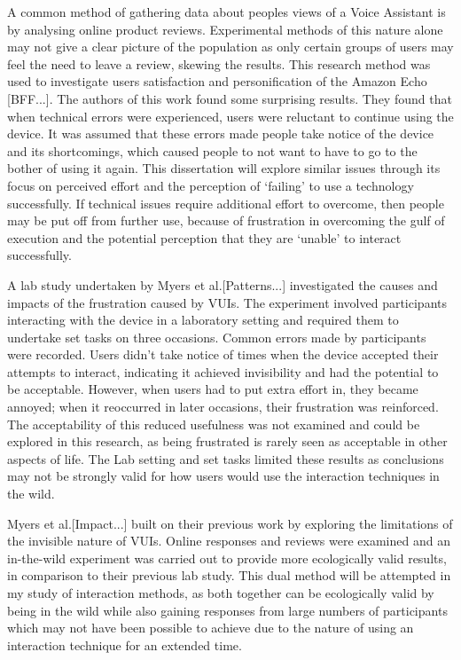 \documentclass{l4proj}
\begin{document}
A common method of gathering data about peoples views of a Voice Assistant is by analysing online product reviews. Experimental methods of this nature alone may not give a clear picture of the population as only certain groups of users may feel the need to leave a review, skewing the results. This research method was used to investigate users satisfaction and personification of the Amazon Echo [BFF...]. The authors of this work found some surprising results. They found that when technical errors were experienced, users were reluctant to continue using the device. It was assumed that these errors made people take notice of the device and its shortcomings, which caused people to not want to have to go to the bother of using it again. This dissertation will explore similar issues through its focus on perceived effort and the perception of `failing' to use a technology successfully. If technical issues require additional effort to overcome, then people may be put off from further use, because of frustration in overcoming the gulf of execution and the potential perception that they are `unable' to interact successfully.

A lab study undertaken by Myers et al.[Patterns...] investigated the causes and impacts of the frustration caused by VUIs. The experiment involved participants interacting with the device in a laboratory setting and required them to undertake set tasks on three occasions. Common errors made by participants were recorded. Users didn't take notice of times when the device accepted their attempts to interact, indicating it achieved invisibility and had the potential to be acceptable. However, when users had to put extra effort in, they became annoyed; when it reoccurred in later occasions, their frustration was reinforced. The acceptability of this reduced usefulness was not examined and could be explored in this research, as being frustrated is rarely seen as acceptable in other aspects of life. The Lab setting and set tasks limited these results as conclusions may not be strongly valid for how users would use the interaction techniques in the wild.

Myers et al.[Impact...] built on their previous work by exploring the limitations of the invisible nature of VUIs. Online responses and reviews were examined and an in-the-wild experiment was carried out to provide more ecologically valid results, in comparison to their previous lab study. This dual method will be attempted in my study of interaction methods, as both together can be ecologically valid by being in the wild while also gaining responses from large numbers of participants which may not have been possible to achieve due to the nature of using an interaction technique for an extended time.
\end{document}
